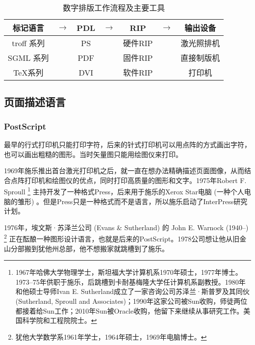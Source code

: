 \begin{table}[!htbp]
\centering
\caption{数字排版工作流程及主要工具}
\label{tab:digital_typesetting}
\begin{tabular}{ccccccc}
    \toprule
    标记语言 & $\to$ & PDL & $\to$ & RIP & $\to$ & 输出设备 \\
    \midrule
    troff 系列 & & PS  & & 硬件RIP & & 激光照排机 \\
    SGML 系列  & & PDF & & 固件RIP & & 直接制版机 \\
    \TeX 系列 & & DVI & & 软件RIP & & 打印机 \\
    \bottomrule
\end{tabular}
\end{table}

\subsection{页面描述语言}

\subsubsection{PostScript}
最早的行式打印机只能打印字符，后来的针式打印机可以用点阵的方式画出字符，也可以画出粗糙的图形。当时矢量图只能用绘图仪来打印。

1969年施乐\indexXerox 推出首台激光打印机之后，就一直在想办法精确描述页面图像，从而结合点阵打印机和绘图仪的优点，同时打印高质量的图形和文字。1975年Robert F. Sproull\indexSproull{} \footnote{1967年哈佛大学物理学士，斯坦福大学计算机系1970年硕士，1977年博士。1973--75年供职于施乐，后跳槽到卡耐基梅隆大学任计算机系副教授。1980年和他硕士导师Ivan E. Sutherland成立了一家咨询公司苏泽兰·斯普罗及其同伙 (Sutherland, Sproull and Associates)；1990年这家公司被Sun收购，师徒两位都接着给Sun工作；2010年Sun被Oracle收购，他留下来继续从事研究工作。美国科学院和工程院院士。} 主持开发了一种格式Press，后来用于施乐的Xerox Star电脑 (一种个人电脑的雏形) 。但是Press只是一种格式而不是语言，所以施乐启动了InterPress研究计划。

1976年，埃文斯·苏泽兰公司 (Evans \& Sutherland)\indexEvansSutherland{} 的 John E. Warnock (1940--)\indexWarnock{} \footnote{犹他大学数学系1961年学士，1964年硕士，1969年电脑博士。} 正在酝酿一种图形设计语言，也就是后来的PostScript。1978公司想让他从旧金山分部搬到犹他州总部，他不想搬家就跳槽到了施乐。

